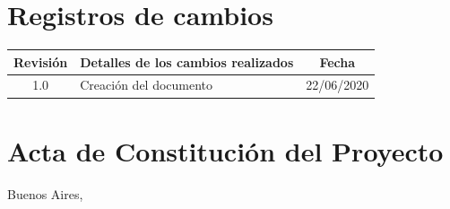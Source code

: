 \documentclass[11pt]{charter}
\begin{document}
\maketitle
\thispagestyle{empty}
\pagebreak


\thispagestyle{empty}
{\setlength{\parskip}{0pt}
\tableofcontents{}
}
\pagebreak


\section{Registros de cambios}
\label{sec:registro}


\begin{table}[ht]
\label{tab:registro}
\centering

\begin{tabularx}{\linewidth}{@{}|c|X|c|@{}}
\hline
\rowcolor[HTML]{C0C0C0} 
Revisión & \multicolumn{1}{c|}{\cellcolor[HTML]{C0C0C0}Detalles de los cambios realizados} & Fecha      \\ \hline
1.0      & Creación del documento                                                          & 22/06/2020 \\ \hline
\end{tabularx}
\end{table}

\pagebreak



\section{Acta de Constitución del Proyecto}
\label{sec:acta}

\begin{flushright}
Buenos Aires, \fechaInicioName
\end{flushright}

\vspace{2cm}
\end{document}
